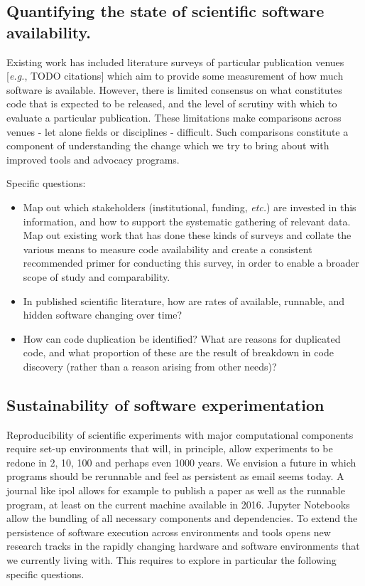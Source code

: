 \documentclass[a4paper,UKenglish]{dagman}
\newcommand{\eg}{\emph{e.g.},\xspace}
\newcommand{\etc}{\emph{etc.}\xspace}
\begin{document}
\subsection{Quantifying the state of scientific software availability.}

Existing work has included literature surveys of particular publication venues [\eg TODO citations] which aim to provide some measurement of how much software is available. However, there is limited consensus on what constitutes code that is expected to be released, and the level of scrutiny with which to evaluate a particular publication. These limitations make comparisons across venues - let alone fields or disciplines - difficult. Such comparisons constitute a component of understanding the change which we try to bring about with improved tools and advocacy programs. 

Specific questions:
\begin{itemize}
\item Map out which stakeholders (institutional, funding, \etc) are invested in this information, and how to support the systematic gathering of relevant data. Map out existing work that has done these kinds of surveys and collate the various means to measure code availability and create a consistent recommended primer for conducting this survey, in order to enable a broader scope of study and comparability.
\item In published scientific literature, how are rates of available, runnable, and hidden software changing over time?
\item How can code duplication be identified? What are reasons for duplicated code, and what proportion of these are the result of breakdown in code discovery (rather than a reason arising from other needs)?
\end{itemize}

\subsection{Sustainability of software experimentation}

Reproducibility of scientific experiments with major computational components require set-up environments that will, in principle, allow experiments to be redone in 2, 10, 100 and perhaps even 1000 years. We envision a future in which programs should be rerunnable and feel as persistent as email seems today. A journal like ipol allows for example to publish a paper as well as the runnable program, at least on the current machine available in 2016. Jupyter Notebooks allow the bundling of all necessary components and dependencies. To extend the persistence of software execution across environments and tools opens new research tracks in the rapidly changing hardware and software environments that we currently living with. This requires to explore in particular the following specific questions. 
\end{document}
